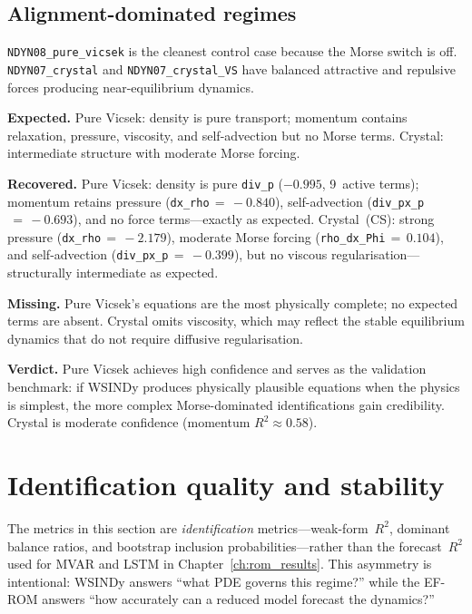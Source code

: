 \subsection{Alignment-dominated regimes}
\label{subsec:interp_alignment}

\texttt{NDYN08\_pure\_vicsek} is the cleanest control case because the
Morse switch is off.  \texttt{NDYN07\_crystal} and
\texttt{NDYN07\_crystal\_VS} have balanced attractive and repulsive forces
producing near-equilibrium dynamics.

\noindent\textbf{Expected.}
Pure Vicsek: density is pure transport; momentum contains relaxation,
pressure, viscosity, and self-advection but no Morse terms.
Crystal: intermediate structure with moderate Morse forcing.

\noindent\textbf{Recovered.}
Pure Vicsek: density is pure \texttt{div\_p} ($-0.995$, 9~active terms);
momentum retains pressure (\texttt{dx\_rho}${}\,=\,-0.840$),
self-advection (\texttt{div\_px\_p}${}\,=\,-0.693$), and no force
terms---exactly as expected.
Crystal~(CS): strong pressure (\texttt{dx\_rho}${}\,=\,-2.179$), moderate
Morse forcing (\texttt{rho\_dx\_Phi}${}\,=\,0.104$), and self-advection
(\texttt{div\_px\_p}${}\,=\,-0.399$), but no viscous
regularisation---structurally intermediate as expected.

\noindent\textbf{Missing.}
Pure Vicsek's equations are the most physically complete; no expected terms
are absent.  Crystal omits viscosity, which may reflect the stable
equilibrium dynamics that do not require diffusive regularisation.

\noindent\textbf{Verdict.}
Pure Vicsek achieves high confidence and serves as the validation
benchmark: if WSINDy produces physically plausible equations when the
physics is simplest, the more complex Morse-dominated identifications gain
credibility.  Crystal is moderate confidence (momentum $R^2\approx 0.58$).

\section{Identification quality and stability}
\label{sec:identification_quality}

The metrics in this section are \emph{identification}
metrics---weak-form~$R^2$, dominant balance ratios, and bootstrap inclusion
probabilities---rather than the forecast~$R^2$ used for MVAR and LSTM in
Chapter~\ref{ch:rom_results}.  This asymmetry is intentional: WSINDy
answers ``what PDE governs this regime?'' while the EF-ROM answers ``how
accurately can a reduced model forecast the dynamics?''

